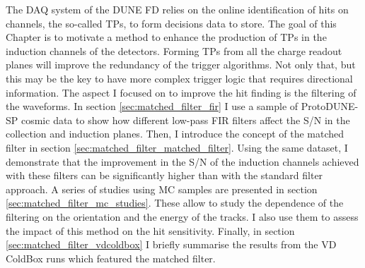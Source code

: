 The DAQ system of the DUNE FD relies on the online identification of hits on channels, the so-called TPs, to form decisions data to store. The goal of this Chapter is to motivate a method to enhance the production of TPs in the induction channels of the detectors. Forming TPs from all the charge readout planes will improve the redundancy of the trigger algorithms. Not only that, but this may be the key to have more complex trigger logic that requires directional information. The aspect I focused on to improve the hit finding is the filtering of the waveforms. In section \ref{sec:matched_filter_fir} I use a sample of ProtoDUNE-SP cosmic data to show how different low-pass FIR filters affect the S/N in the collection and induction planes. Then, I introduce the concept of the matched filter in section \ref{sec:matched_filter_matched_filter}. Using the same dataset, I demonstrate that the improvement in the S/N of the induction channels achieved with these filters can be significantly higher than with the standard filter approach. A series of studies using MC samples are presented in section \ref{sec:matched_filter_mc_studies}. These allow to study the dependence of the filtering on the orientation and the energy of the tracks. I also use them to assess the impact of this method on the hit sensitivity. Finally, in section \ref{sec:matched_filter_vdcoldbox} I briefly summarise the results from the VD ColdBox runs which featured the matched filter.